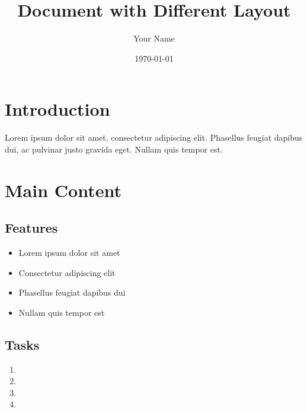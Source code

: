 \documentclass{article}
\begin{document}
\title{Document with Different Layout}
\author{Your Name}
\date{\today}
\maketitle

\section{Introduction}
Lorem ipsum dolor sit amet, consectetur adipiscing elit. Phasellus feugiat dapibus dui, ac pulvinar justo gravida eget. Nullam quis tempor est.

\section{Main Content}
\subsection{Features}
\begin{itemize}[label=\textbullet]
    \item Lorem ipsum dolor sit amet
    \item Consectetur adipiscing elit
    \item Phasellus feugiat dapibus dui
    \item Nullam quis tempor est
\end{itemize}

\subsection{Tasks}
\begin{enumerate}
    \item {}
    \item {}
    \item {}
    \item {}
\end{enumerate}
\end{document}
